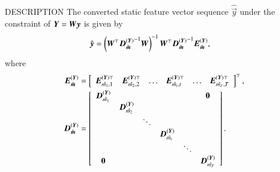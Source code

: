 \begin{qsection}{DESCRIPTION}
 The converted static feature vector sequence $\hat{\vec{y}}$ under the constraint
 of $\vec{Y} = \W \vec{y}$ is given by
 \begin{align*}
  \hat{\vec{y}} &=\left(\W\trans {\vec{D}\dim{\sY}_{\hat{\sm}}}\inv \W\right)\inv
  \W\trans {\vec{D}\dim{\sY}_{\hat{\sm}}}\inv \vec{E}\dim{\sY}_{\hat{\sm}},
 \end{align*}
 where
 \begin{align*}
 \vec{E}\dim{\sY}_{\hat{\sm}}
  &= \left[
  \begin{array}{cccccc}
   \vec{E}^{(\sY)\top}_{\scriptstyle \hat{m_1}, 1}
    &
    \vec{E}^{(\sY)\top}_{\scriptstyle \hat{m_2}, 2}
    &
    \ldots
    &
    \vec{E}^{(\sY)\top}_{\scriptstyle \hat{m_t}, t}
    &
    \ldots
    &
    \vec{E}^{(\sY)\top}_{\scriptstyle \hat{m_T}, T}
  \end{array}
  \right]\trans,\\
   \vec{D}\dim{\sY}_{\hat{\sm}} &=
  \left[
   \begin{array}{cccccc}
    \vec{D}\dim{\sY}_{\scriptstyle \hat{m_1}} & & & & & \vec{0}\\
    & \vec{D}\dim{\sY}_{\scriptstyle \hat{m_2}}  & & & & \\
    & & \ddots  & & & \\
    & & & \vec{D}\dim{\sY}_{\scriptstyle \hat{m_t}} & &  \\
    & & & & \ddots & \\
    \vec{0} & & & & &
     \vec{D}\dim{\sY}_{\scriptstyle \hat{m_T}}
   \end{array}
  \right].
\end{align*}


\end{qsection}
